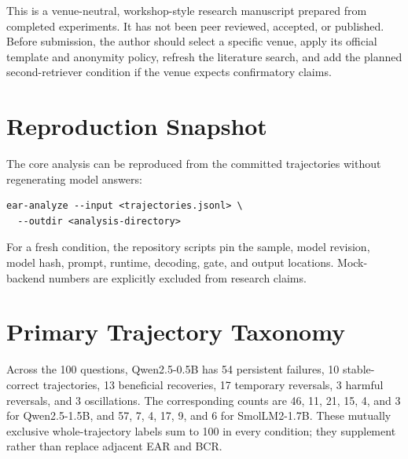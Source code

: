 \documentclass[10pt,twocolumn]{article}
\newcommand{\qsmall}{Qwen2.5-0.5B}
\newcommand{\qlarge}{Qwen2.5-1.5B}
\newcommand{\smol}{SmolLM2-1.7B}
\begin{document}
This is a venue-neutral, workshop-style research manuscript prepared from completed experiments. It has not been peer reviewed, accepted, or published. Before submission, the author should select a specific venue, apply its official template and anonymity policy, refresh the literature search, and add the planned second-retriever condition if the venue expects confirmatory claims.

\balance



\appendix
\section{Reproduction Snapshot}

The core analysis can be reproduced from the committed trajectories without regenerating model answers:
\begin{verbatim}
ear-analyze --input <trajectories.jsonl> \
  --outdir <analysis-directory>
\end{verbatim}
For a fresh condition, the repository scripts pin the sample, model revision, model hash, prompt, runtime, decoding, gate, and output locations. Mock-backend numbers are explicitly excluded from research claims.

\section{Primary Trajectory Taxonomy}

Across the 100 questions, \qsmall{} has 54 persistent failures, 10 stable-correct trajectories, 13 beneficial recoveries, 17 temporary reversals, 3 harmful reversals, and 3 oscillations. The corresponding counts are 46, 11, 21, 15, 4, and 3 for \qlarge{}, and 57, 7, 4, 17, 9, and 6 for \smol{}. These mutually exclusive whole-trajectory labels sum to 100 in every condition; they supplement rather than replace adjacent EAR and BCR.
\end{document}
